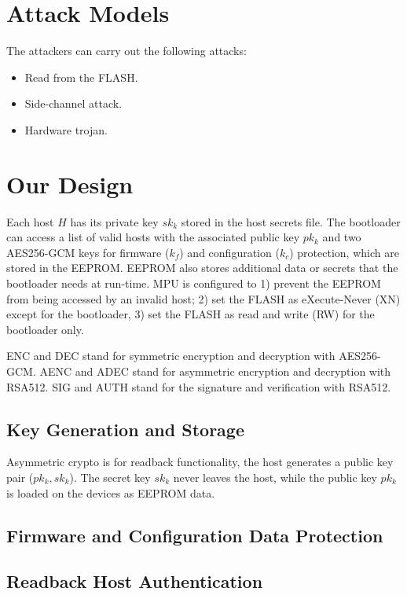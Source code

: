 \documentclass[11pt,oneside,onecolumn,letterpaper]{article}
\begin{document}
\section{Attack Models}

The attackers can carry out the following attacks:

\begin{itemize}
  \item Read from the FLASH.
  \item Side-channel attack.
  \item Hardware trojan.
\end{itemize}


\section{Our Design}

Each host $H$ has its private key $sk_k$ stored in the host secrets file.
The bootloader can access a list of valid hosts with the associated public key $pk_k$ and two AES256-GCM keys for firmware ($k_f$) and configuration ($k_c$) protection, which are stored in the EEPROM.
EEPROM also stores additional data or secrets that the bootloader needs at run-time.
MPU is configured to 1) prevent the EEPROM from being accessed by an invalid host; 2) set the FLASH as eXecute-Never (XN) except for the bootloader, 3) set the FLASH as read and write (RW) for the bootloader only. 

ENC and DEC stand for symmetric encryption and decryption with AES256-GCM.
AENC and ADEC stand for asymmetric encryption and decryption with RSA512.
SIG and AUTH stand for the signature and verification with RSA512.

\subsection{Key Generation and Storage}
Asymmetric crypto is for readback functionality, the host generates a public key pair ($pk_k, sk_k$).
The secret key $sk_k$ never leaves the host, while the public key $pk_k$ is loaded on the devices as EEPROM data.

\subsection{Firmware and Configuration Data Protection}

\subsection{Readback Host Authentication}
\end{document}
